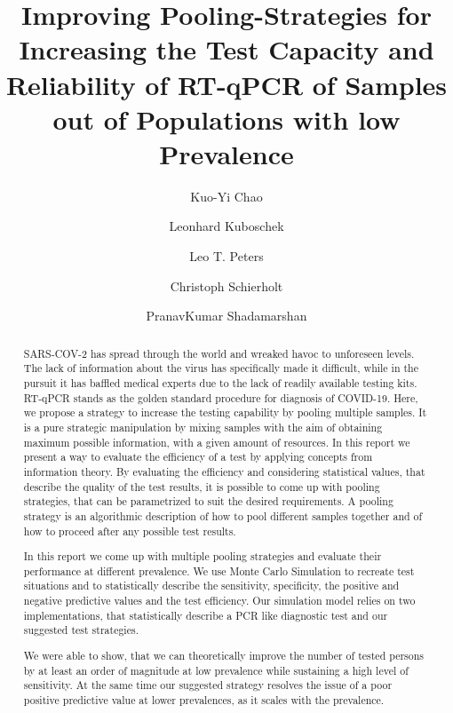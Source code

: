 \documentclass[fleqn,10pt]{wlscirep}
\begin{document}
	
	\title{Improving Pooling-Strategies for Increasing the Test Capacity and Reliability of RT-qPCR of Samples out of Populations with low Prevalence} 
	
	
	\author[*]{Kuo-Yi Chao}
	\author[*]{Leonhard Kuboschek}
	\author[*]{Leo T. Peters}
	\author[*]{Christoph Schierholt}
	\author[*]{PranavKumar Shadamarshan}
	
	
	
	
	\begin{abstract}
		
		SARS-COV-2 has spread through the world and wreaked havoc to unforeseen levels. The lack of information about the virus has specifically made it difficult, while in the pursuit it has baffled medical experts due to the lack of readily available testing kits. RT-qPCR stands as the golden standard procedure for diagnosis of COVID-19. Here, we propose a strategy to increase the testing capability by pooling multiple samples. It is a pure strategic manipulation by mixing samples with the aim of obtaining maximum possible information, with a given amount of resources.
		In this report we present a way to evaluate the efficiency of a test by applying concepts from information theory. By evaluating the efficiency and considering statistical values, that describe the quality of the test results, it is possible to come up with pooling strategies, that can be parametrized to suit the desired requirements. A pooling strategy is an algorithmic description of how to pool different samples together and of how to proceed after any possible test results.
		
		In this report we come up with multiple pooling strategies and evaluate their performance at different prevalence. We use Monte Carlo Simulation to recreate test situations and to statistically describe the sensitivity, specificity, the positive and negative predictive values and the test efficiency.
		Our simulation model relies on two implementations, that statistically describe a PCR like diagnostic test and our suggested test strategies.
		
		We were able to show, that we can theoretically improve the number of tested persons by at least an order of magnitude at low prevalence while sustaining a high level of sensitivity.
		At the same time our suggested strategy resolves the issue of a poor positive predictive value at lower prevalences, as it scales with the prevalence.
		
		
		
	\end{abstract}
	
\end{document}
